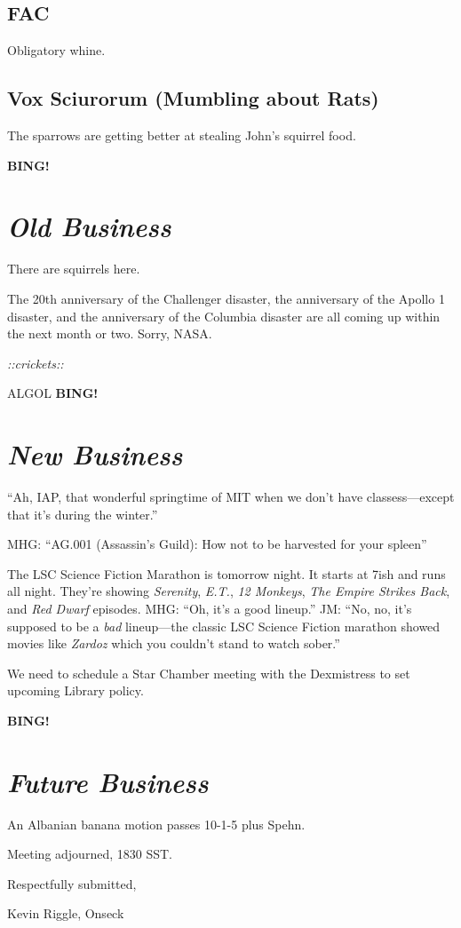 \documentclass[10pt]{article}
\newcommand{\bing}{{\bf BING!} }
\newcommand{\goto}[1]{\bing \vskip 12pt \section*{{\em{#1}}}}
\newcommand{\ps}{ plus Spehn\xspace}
\begin{document}

\subsection*{FAC}
Obligatory whine.



\subsection*{Vox Sciurorum (Mumbling about Rats)}
The sparrows are getting better at stealing John's squirrel food.

\goto{Old Business}
There are squirrels here.

The 20th anniversary of the Challenger disaster, the anniversary of the Apollo 1 disaster, and
the anniversary of the Columbia disaster are all coming up within the next month or two.  Sorry,
NASA.

\emph{::crickets::}

ALGOL
\goto{New Business}
``Ah, IAP, that wonderful springtime of MIT when we don't have classess---except that it's during
the winter.''

MHG: ``AG.001 (Assassin's Guild): How not to be harvested for your spleen''

The LSC Science Fiction Marathon is tomorrow night.  It starts at 7ish and runs all night.  They're
showing \emph{Serenity}, \emph{E.T.}, \emph{12 Monkeys}, \emph{The Empire Strikes Back}, and 
\emph{Red Dwarf} episodes.  MHG: ``Oh, it's a good lineup.'' 
JM: ``No, no, it's supposed to be a \emph{bad}
lineup---the classic LSC Science Fiction marathon showed movies like \emph{Zardoz} which you 
couldn't stand to watch sober.''

We need to schedule a Star Chamber meeting with the Dexmistress to set upcoming Library policy.

\goto{Future Business}

An Albanian banana motion passes 10-1-5\ps.

\vspace{12pt}

\noindent
Meeting adjourned, 1830 SST.

\vspace{18pt}

\centerline{Respectfully submitted,}
\centerline{Kevin Riggle, Onseck}
\end{document}
